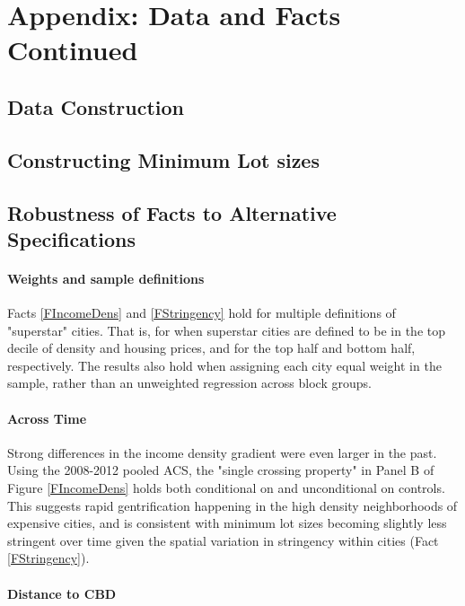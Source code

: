 \documentclass[11pt]{article}
\begin{document}
	\newpage
	\appendix
	\normalsize
	\section{Appendix: Data and Facts Continued}\label{DataandFactsContinued}
	
	\subsection{Data Construction} \label{Appendix:DataConstruction}
	
	
	\subsection{Constructing Minimum Lot sizes} \label{Appendix:MinimumLotSizes}
	
	\subsection{Robustness of Facts to Alternative Specifications}\label{Appendix:Robustness}
	
	\paragraph*{Weights and sample definitions} Facts \ref{FIncomeDens} and \ref{FStringency} hold for multiple definitions of "superstar" cities. That is, for when superstar cities are defined to be in the top decile of density and housing prices, and for the top half and bottom half, respectively. The results also hold when assigning each city equal weight in the sample, rather than an unweighted regression across block groups. 
	
	\paragraph*{Across Time}  Strong differences in the income density gradient were even larger in the past. Using the 2008-2012 pooled ACS, the "single crossing property" in Panel B of Figure \ref{FIncomeDens} holds both conditional on and unconditional on controls. This suggests rapid gentrification happening in the high density neighborhoods of expensive cities, and is consistent with minimum lot sizes becoming slightly less stringent over time given the spatial variation in stringency within cities (Fact \ref{FStringency}). 
	
	\paragraph*{Distance to CBD}
	
\end{document}
